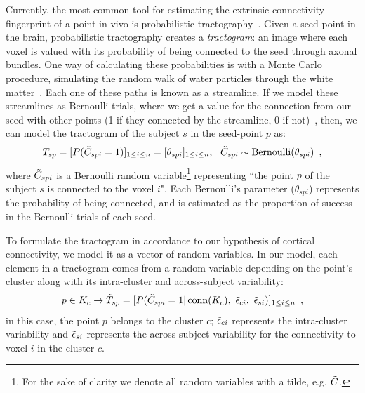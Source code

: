 Currently, the most common tool for estimating the extrinsic connectivity
fingerprint of a point in vivo is probabilistic tractography~\citep{Jbabdi2013}.
Given a seed-point in the brain, probabilistic tractography creates a
\textit{tractogram}: an image where each voxel is valued with its probability
of being connected to the seed through axonal bundles. One way of calculating
these probabilities is with a Monte Carlo procedure, simulating the random walk
of water particles through the white matter~\citep{Behrens2003a}. Each one of
these paths is known as a streamline. If we model these streamlines as Bernoulli
trials, where we get a value for the connection from our seed with other points
(1 if they connected by the streamline, 0 if not)~\citep{Behrens2003a}, then, we
can model the tractogram of the subject $s$ in the seed-point $p$ as:
%
\begin{equation}
    \label{eq:tractogram}
    T_{sp} = 
      [P(\tilde C_{spi}=1)]_{1 \leq i \leq n} =
      [\theta_{spi}]_{1 \leq i \leq n}, ~~ \tilde C_{spi} \sim \operatorname{Bernoulli}(\theta_{spi})
    \enspace,
\end{equation}
%
where $\tilde C_{spi}$ is a Bernoulli random variable\footnote{For the sake of
clarity we denote all random variables with a tilde, e.g. $\tilde C$.} 
representing ``the point $p$ of the subject $s$ is connected to the voxel $i$".
Each Bernoulli's parameter ($\theta_{spi}$) represents the probability of being
connected, and is estimated as the proportion of success in the Bernoulli
trials of each seed.

To formulate the tractogram in accordance to our hypothesis of cortical
connectivity, we model it as a vector of random variables. In our
model, each element in a tractogram comes from a random variable depending on
the point's cluster along with its intra-cluster and across-subject variability:
\begin{equation}
    \label{eq:tractogram_rv}
        p \in K_c \rightarrow
        \tilde T_{sp} = 
        [P(\tilde C_{spi}=1 | \operatorname{conn}(K_c), ~\tilde \epsilon_{ci}, ~\tilde \epsilon_{si})]_{1 \leq i \leq n}
        \enspace ,
\end{equation}
%
in this case, the point $p$ belongs to the cluster $c$;  $\tilde \epsilon_{ci}$ 
represents the intra-cluster variability and $\tilde \epsilon_{si}$ represents the
across-subject variability for the connectivity to voxel $i$ in the cluster $c$. 

